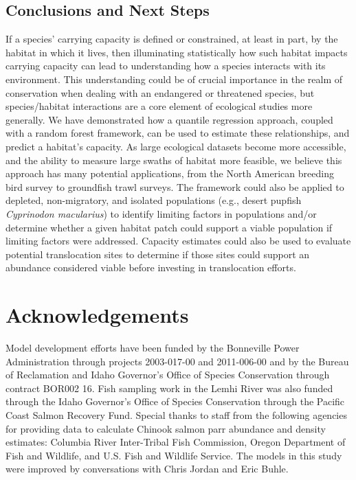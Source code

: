 \documentclass[
  12pt,
]{article}
\begin{document}
\hypertarget{conclusions-and-next-steps}{%
\subsection{Conclusions and Next Steps}\label{conclusions-and-next-steps}}

If a species' carrying capacity is defined or constrained, at least in part, by the habitat in which it lives, then illuminating statistically how such habitat impacts carrying capacity can lead to understanding how a species interacts with its environment. This understanding could be of crucial importance in the realm of conservation when dealing with an endangered or threatened species, but species/habitat interactions are a core element of ecological studies more generally. We have demonstrated how a quantile regression approach, coupled with a random forest framework, can be used to estimate these relationships, and predict a habitat's capacity. As large ecological datasets become more accessible, and the ability to measure large swaths of habitat more feasible, we believe this approach has many potential applications, from the North American breeding bird survey to groundfish trawl surveys. The framework could also be applied to depleted, non-migratory, and isolated populations (e.g., desert pupfish \emph{Cyprinodon macularius}) to identify limiting factors in populations and/or determine whether a given habitat patch could support a viable population if limiting factors were addressed. Capacity estimates could also be used to evaluate potential translocation sites to determine if those sites could support an abundance considered viable before investing in translocation efforts.

\hypertarget{acknowledgements}{%
\section{Acknowledgements}\label{acknowledgements}}

Model development efforts have been funded by the Bonneville Power Administration through projects 2003-017-00 and 2011-006-00 and by the Bureau of Reclamation and Idaho Governor's Office of Species Conservation through contract BOR002 16. Fish sampling work in the Lemhi River was also funded through the Idaho Governor's Office of Species Conservation through the Pacific Coast Salmon Recovery Fund. Special thanks to staff from the following agencies for providing data to calculate Chinook salmon parr abundance and density estimates: Columbia River Inter-Tribal Fish Commission, Oregon Department of Fish and Wildlife, and U.S. Fish and Wildlife Service. The models in this study were improved by conversations with Chris Jordan and Eric Buhle.
\end{document}
